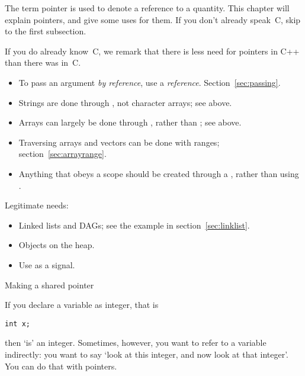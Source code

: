 
The term pointer is used to denote a reference to a quantity.  This
chapter will explain pointers, and give some uses for them.  If you
don't already speak~C, skip to the first subsection.

If you do
already know~C, we remark that there is less need for pointers in C++
than there was in~C.

\begin{itemize}
\item To pass an argument
  \emph{by reference},
  use a \emph{reference}.
  Section~\ref{sec:passing}.
\item Strings are done through , not character arrays;
  see above.
\item Arrays can largely be done through , rather than
  ; see above.
\item Traversing arrays and vectors can be done with ranges;
  section~\ref{sec:arrayrange}.
\item Anything that obeys a scope should be created through a
  , rather than using .
\end{itemize}

Legitimate needs:
\begin{itemize}
\item Linked lists and \acp{DAG}; see the example in section~\ref{sec:linklist}.
\item Objects on the heap.
\item Use  as a signal.
\end{itemize}

 {Making a shared pointer}

If you declare a variable  as integer, that is
\begin{verbatim}
int x;
\end{verbatim}
then  `is' an integer. Sometimes, however, you want to refer to a
variable indirectly: you want to say `look at this integer, and now
look at that integer'. You can do that with pointers.

